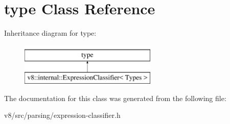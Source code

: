 \hypertarget{classstd_1_1conditional_1_1type}{}\section{type Class Reference}
\label{classstd_1_1conditional_1_1type}
Inheritance diagram for type\+:\begin{figure}[H]
\begin{center}
\leavevmode
\includegraphics[height=2.000000cm]{classstd_1_1conditional_1_1type}
\end{center}
\end{figure}


The documentation for this class was generated from the following file\+:\begin{DoxyCompactItemize}
\item 
v8/src/parsing/expression-\/classifier.\+h\end{DoxyCompactItemize}
